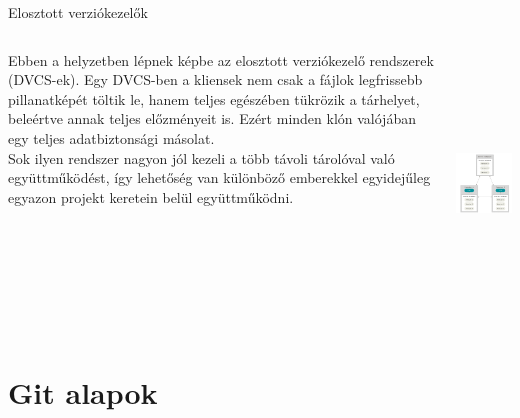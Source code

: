 \documentclass[english, aspectratio=169]{beamer}
\begin{document}
\begin{frame}{Elosztott verziókezelők}
\begin{columns}
\begin{column}{0.5\textwidth}
Ebben a helyzetben lépnek képbe az elosztott verziókezelő rendszerek (DVCS-ek). Egy DVCS-ben a kliensek nem csak a fájlok legfrissebb pillanatképét töltik le, hanem teljes egészében tükrözik a tárhelyet, beleértve annak teljes előzményeit is. Ezért minden klón valójában egy teljes adatbiztonsági másolat.\\
Sok ilyen rendszer nagyon jól kezeli a több távoli tárolóval való együttműködést, így lehetőség van különböző emberekkel egyidejűleg egyazon projekt keretein belül együttműködni.
\end{column}
\begin{column}{0.5\textwidth}
\begin{center}
\includegraphics[height=7cm, keepaspectratio]{images/distributed_vcs.png}
\end{center}
\end{column}
\end{columns}
\end{frame}

\section{Git alapok}
\end{document}

